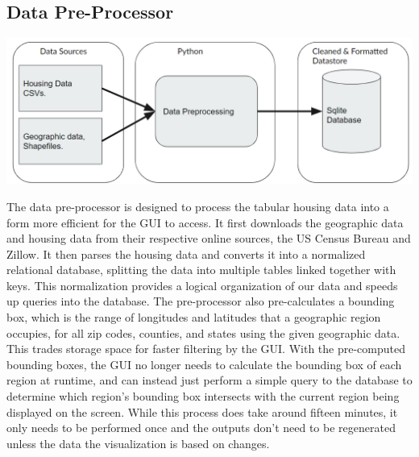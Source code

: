 \documentclass{article}
\begin{document}
\subsection{Data Pre-Processor}
\begin{center}
  \includegraphics[scale=0.5]{sysarch_pre.png} 
\end{center}  
The data pre-processor is designed to process the tabular housing data into a form more efficient
for the GUI to access. It first downloads the geographic data and housing data from their respective online
sources, the US Census Bureau and Zillow. It then parses the housing data and converts it into a normalized
relational database, splitting the data into multiple tables linked together with keys. This normalization
provides a logical organization of our data and speeds up queries into the database. The pre-processor also
pre-calculates a bounding box, which is the range of longitudes and latitudes that a geographic region occupies,
for all zip codes, counties, and states using the given geographic data. This trades storage space for faster filtering by the GUI. With the 
pre-computed bounding boxes, the GUI no longer needs to calculate the bounding box of each region at runtime,
and can instead just perform a simple query to the database to determine which region's bounding box intersects
with the current region being displayed on the screen. While this process does take around fifteen minutes, it only needs to be performed
once and the outputs don't need to be regenerated unless the data the visualization is based on changes.
\end{document}
